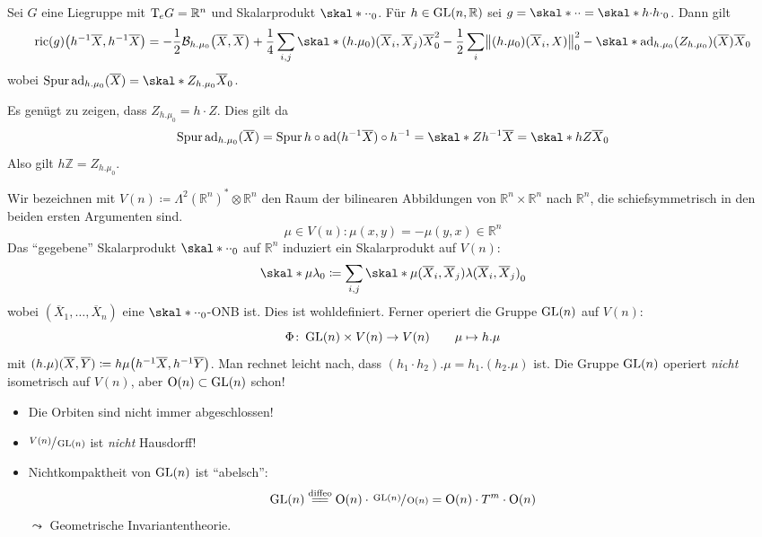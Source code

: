 \begin{satz}
	Sei $G$ eine Liegruppe mit $\mathrm{T}\mkern-0.85mu_e G = \mathbb{R}^n$ und Skalarprodukt $\skal*{\cdot }{\cdot }_0$.
	Für $h \in \operatorname{GL}(n,\mathbb{R})$ sei $g = \skal*{\cdot }{\cdot } = \skal*{h \cdot }{h \cdot }_0$.
	Dann gilt
	\[
		\ric(g) \enbrace*{h^{-1} \overline{X}, h^{-1} \overline{X}} = -\frac{1}{2} \mathcal{B}_{h.\mu_0} \enbrace*{\overline{X},\overline{X}} + \frac{1}{4} \sum_{i,j} \skal*{(h.\mu_0)(\overline{X}_i, \overline{X}_j)}{\overline{X}}_0^2 - \frac{1}{2} \sum_i \norm*{(h.\mu_0)(\overline{X}_i, X)}_0^2 - \skal*{\ad_{h.\mu_0}(Z_{h.\mu_0})(\overline{X})}{\overline{X}} _0
	\]
	wobei $\Spur \ad_{h.\mu_0}(\overline{X}) = \skal*{Z_{h.\mu_0}}{\overline{X}}_0$.
\end{satz}
\begin{beweis}
	Es genügt zu zeigen, dass $Z_{h.\mu_0} = h \cdot Z$.
	Dies gilt da
	\begin{align}
		\Spur \ad_{h.\mu_0} (\overline{X}) = \Spur h \circ \ad(h^{-1} \overline{X}) \circ h^{-1} = \skal*{Z}{h^{-1} \overline{X}} = \skal*{h Z}{\overline{X}}_0 
	\end{align}
	Also gilt $h \mathbb{Z} = Z_{h.\mu_0}$.
\end{beweis}

Wir bezeichnen mit $V(n) \coloneqq  \Lambda^2(\mathbb{R}^n)^* \otimes \mathbb{R}^n$ den Raum der bilinearen Abbildungen von $\mathbb{R}^n \times \mathbb{R}^n$ nach $\mathbb{R}^n$, die schiefsymmetrisch in den beiden ersten Argumenten sind.
\[
	\mu \in V(u) : \mu(x,y) = - \mu(y,x) \in \mathbb{R}^n
\]
Das \enquote{gegebene} Skalarprodukt $\skal*{\cdot }{\cdot }_0$ auf $\mathbb{R}^n$ induziert ein Skalarprodukt auf $V(n)$:
\[
	\skal*{\mu}{\lambda}_0 \coloneqq \sum_{i,j} \skal*{\mu(\overline{X}_i, \overline{X}_j)}{\lambda(\overline{X}_i, \overline{X}_j)}_0
\]
wobei $(\overline{X}_1, \ldots ,\overline{X}_n)$ eine $\skal*{\cdot }{\cdot }_0$-ONB ist. Dies ist wohldefiniert.
Ferner operiert die Gruppe $\operatorname{GL}(n)$ auf $V(n)$:
\[
	\Phi \colon \operatorname{GL}(n) \times V(n) \to V(n) \qquad \mu \mapsto h.\mu
\]
mit $(h.\mu)(\overline{X},\overline{Y}) \coloneqq h \mu \enbrace*{h^{-1} \overline{X}, h^{-1} \overline{Y}}$.
Man rechnet leicht nach, dass $(h_1 \cdot h_2).\mu = h_1.(h_2.\mu)$ ist.
Die Gruppe $\operatorname{GL}(n)$ operiert \emph{nicht} isometrisch auf $V(n)$, aber $\operatorname{O}(n) \subset \operatorname{GL}(n)$ schon!

\begin{bemerkung*}
	\begin{itemize}
		\item Die Orbiten sind nicht immer abgeschlossen!
		\item $\sfrac{V(n)}{\operatorname{GL}(n)}$ ist \emph{nicht} Hausdorff!
		\item Nichtkompaktheit von $\operatorname{GL}(n)$ ist \enquote{abelsch}:
		\[
			\GL(n) \StackText{diffeo}{=\joinrel=}\On(n) \cdot \sfrac{\GL(n)}{\On(n)} = \On(n) \cdot T^m \cdot \On(n)
		\]
		$\leadsto$ Geometrische Invariantentheorie.
	\end{itemize}
\end{bemerkung*}

